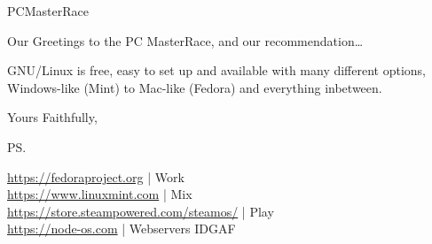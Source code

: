 \documentclass[a5paper, 12pt]{letter} %
\begin{document}
\begin{letter}{PCMasterRace}
\opening{Our Greetings to the PC MasterRace, and our recommendation\ldots}

GNU/Linux is free, easy to set up and available with many different options, Windows-like (Mint) to Mac-like (Fedora) and everything inbetween. 

\closing{Yours Faithfully,}

\ps %

\url{https://fedoraproject.org} | Work \\
\url{https://www.linuxmint.com} | Mix \\
\url{https://store.steampowered.com/steamos/} | Play \\
\url{https://node-os.com} | Webservers IDGAF


\end{letter}
\end{document}
